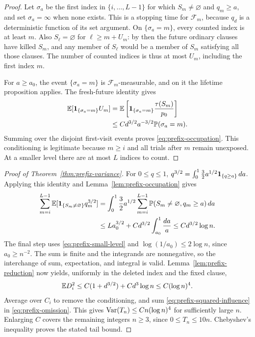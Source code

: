 \begin{proof}
Let \(\sigma_a\) be the first index in \(\{i,\ldots,L-1\}\) for
which \(S_m\ne\varnothing\) and \(q_m\ge a\), and set
\(\sigma_a=\infty\) when none exists.  This is a stopping time for
\(\mathcal F_m\), because \(q_d\) is a deterministic function of
its set argument.  On \(\{\sigma_a=m\}\), every counted index is
at least \(m\).  Also \(S_\ell=\varnothing\) for
\(\ell\ge m+U_m\): by then the future ordinary clauses have killed
\(S_m\), and any member of \(S_\ell\) would be a member of \(S_m\)
satisfying all those clauses.  The number of counted indices is thus
at most \(U_m\), including the first index \(m\).

For \(a\ge a_0\), the event \(\{\sigma_a=m\}\) is
\(\mathcal F_m\)-measurable, and on it the lifetime proposition applies.
The fresh-future identity gives
\begin{align*}
 \mathbb E[\mathbf 1_{\{\sigma_a=m\}}U_m]
 &=\mathbb E\left[\mathbf 1_{\{\sigma_a=m\}}\frac{\tau(S_m)}{p_0}\right]\\
 &\le Cd^{3/2}a^{-3/2}\mathbb P(\sigma_a=m).
\end{align*}
Summing over the disjoint first-visit events proves
\eqref{eq:prefix-occupation}.  This conditioning is legitimate because
\(m\ge i\) and all trials after \(m\) remain unexposed.  At a smaller
level there are at most \(L\) indices to count.
\end{proof}

\begin{proof}[Proof of Theorem~\ref{thm:prefix-variance}]
For \(0\le q\le1\),
\(q^{3/2}=\int_0^1\frac32a^{1/2}\mathbf 1_{\{q\ge a\}}\,da\).
Applying this identity and Lemma~\ref{lem:prefix-occupation} gives
\begin{align*}
 \sum_{m=i}^{L-1}\mathbb E[\mathbf 1_{\{S_m\ne\varnothing\}}q_m^{3/2}]
 &=\int_0^1\frac32a^{1/2}
       \sum_{m=i}^{L-1}\mathbb P(S_m\ne\varnothing,q_m\ge a)\,da\\
 &\le L a_0^{3/2}+Cd^{3/2}\int_{a_0}^1\frac{da}{a}
 \le Cd^{3/2}\log n.
\end{align*}
The final step uses \eqref{eq:prefix-small-level} and
\(\log(1/a_0)\le2\log n\), since \(a_0\ge n^{-2}\).  The sum is finite
and the integrands are
nonnegative, so the interchange of sum, expectation, and integral is
valid.  Lemma~\ref{lem:prefix-reduction} now yields, uniformly in the
deleted index and the fixed clause,
\begin{equation}\label{eq:prefix-squared-influence}
 \mathbb E D_i^2\le C(1+d^{3/2})+Cd^3\log n\le C(\log n)^4.
\end{equation}
Average over \(C_i\) to remove the conditioning, and sum
\eqref{eq:prefix-squared-influence} in \eqref{eq:prefix-omission}.
This gives \(\operatorname{Var}(T_n)\le Cn(\log n)^4\) for sufficiently large
\(n\).  Enlarging \(C\) covers the remaining integers \(n\ge3\),
since \(0\le T_n\le10n\).  Chebyshev's inequality proves the stated
tail bound.
\end{proof}

